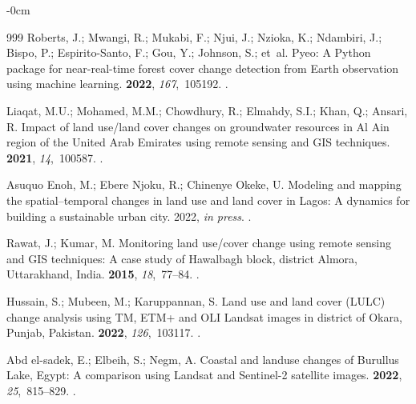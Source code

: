 \documentclass[applsci,article,accept,pdftex,moreauthors]{Definitions/mdpi}
\begin{document}
\begin{adjustwidth}{-\extralength}{0cm}
\begin{thebibliography}{999}
Roberts, J.; Mwangi, R.; Mukabi, F.; Njui, J.; Nzioka, K.; Ndambiri, J.; Bispo,
  P.; Espirito-Santo, F.; Gou, Y.; Johnson, S.;  et~al.
\newblock Pyeo: A Python package for near-real-time forest cover change
  detection from Earth observation using machine learning.
 {\bf 2022}, {\em 167},~105192.
.

Liaqat, M.U.; Mohamed, M.M.; Chowdhury, R.; Elmahdy, S.I.; Khan, Q.; Ansari, R.
\newblock Impact of land use/land cover changes on groundwater resources in Al
  Ain region of the United Arab Emirates using remote sensing and GIS
  techniques.
 {\bf 2021}, {\em
  14},~100587.
.

{Asuquo Enoh}, M.; {Ebere Njoku}, R.; {Chinenye Okeke}, U.
\newblock Modeling and mapping the spatial–temporal changes in land use and
  land cover in Lagos: A dynamics for building a sustainable urban city.
 {2022}, \emph{in press}.
.

Rawat, J.; Kumar, M.
\newblock Monitoring land use/cover change using remote sensing and GIS
  techniques: A case study of Hawalbagh block, district Almora, Uttarakhand,
  India.
 {\bf
  2015}, {\em 18},~77--84.
.

Hussain, S.; Mubeen, M.; Karuppannan, S.
\newblock Land use and land cover (LULC) change analysis using TM, ETM+ and OLI
  Landsat images in district of Okara, Punjab, Pakistan.
 {\bf 2022},
  {\em 126},~103117.
.

{Abd el-sadek}, E.; Elbeih, S.; Negm, A.
\newblock Coastal and landuse changes of Burullus Lake, Egypt: A comparison
  using Landsat and Sentinel-2 satellite images.
 {\bf
  2022}, {\em 25},~815--829.
.


\end{thebibliography}
\end{adjustwidth}
\end{document}
